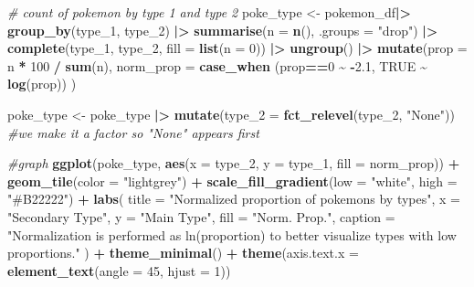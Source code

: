\documentclass[
]{article}
\newenvironment{Shaded}{\begin{snugshade}}{\end{snugshade}}
\newcommand{\AttributeTok}[1]{\textcolor[rgb]{0.13,0.29,0.53}{#1}}
\newcommand{\CommentTok}[1]{\textcolor[rgb]{0.56,0.35,0.01}{\textit{#1}}}
\newcommand{\ConstantTok}[1]{\textcolor[rgb]{0.56,0.35,0.01}{#1}}
\newcommand{\DecValTok}[1]{\textcolor[rgb]{0.00,0.00,0.81}{#1}}
\newcommand{\FloatTok}[1]{\textcolor[rgb]{0.00,0.00,0.81}{#1}}
\newcommand{\FunctionTok}[1]{\textcolor[rgb]{0.13,0.29,0.53}{\textbf{#1}}}
\newcommand{\NormalTok}[1]{#1}
\newcommand{\OtherTok}[1]{\textcolor[rgb]{0.56,0.35,0.01}{#1}}
\newcommand{\SpecialCharTok}[1]{\textcolor[rgb]{0.81,0.36,0.00}{\textbf{#1}}}
\newcommand{\StringTok}[1]{\textcolor[rgb]{0.31,0.60,0.02}{#1}}
\begin{document}
\begin{Shaded}
\begin{Highlighting}[]
\CommentTok{\# count of pokemon by type 1 and type 2}
\NormalTok{poke\_type }\OtherTok{\textless{}{-}}\NormalTok{ pokemon\_df}\SpecialCharTok{|\textgreater{}} 
  \FunctionTok{group\_by}\NormalTok{(type\_1, type\_2) }\SpecialCharTok{|\textgreater{}} 
  \FunctionTok{summarise}\NormalTok{(}\AttributeTok{n =} \FunctionTok{n}\NormalTok{(), }\AttributeTok{.groups =} \StringTok{"drop"}\NormalTok{) }\SpecialCharTok{|\textgreater{}}
  \FunctionTok{complete}\NormalTok{(type\_1, type\_2, }\AttributeTok{fill =} \FunctionTok{list}\NormalTok{(}\AttributeTok{n =} \DecValTok{0}\NormalTok{)) }\SpecialCharTok{|\textgreater{}}
  \FunctionTok{ungroup}\NormalTok{() }\SpecialCharTok{|\textgreater{}} 
  \FunctionTok{mutate}\NormalTok{(}\AttributeTok{prop =}\NormalTok{ n }\SpecialCharTok{*} \DecValTok{100} \SpecialCharTok{/} \FunctionTok{sum}\NormalTok{(n), }
         \AttributeTok{norm\_prop =} \FunctionTok{case\_when}\NormalTok{ (prop}\SpecialCharTok{==}\DecValTok{0} \SpecialCharTok{\textasciitilde{}} \SpecialCharTok{{-}}\FloatTok{2.1}\NormalTok{,}
                                \ConstantTok{TRUE} \SpecialCharTok{\textasciitilde{}} \FunctionTok{log}\NormalTok{(prop))}
\NormalTok{        )}

\NormalTok{poke\_type }\OtherTok{\textless{}{-}}\NormalTok{ poke\_type }\SpecialCharTok{|\textgreater{}}
  \FunctionTok{mutate}\NormalTok{(}\AttributeTok{type\_2 =} \FunctionTok{fct\_relevel}\NormalTok{(type\_2, }\StringTok{"None"}\NormalTok{)) }\CommentTok{\#we make it a factor so "None" appears first}

\CommentTok{\#graph }
\FunctionTok{ggplot}\NormalTok{(poke\_type, }\FunctionTok{aes}\NormalTok{(}\AttributeTok{x =}\NormalTok{ type\_2, }\AttributeTok{y =}\NormalTok{ type\_1, }\AttributeTok{fill =}\NormalTok{ norm\_prop)) }\SpecialCharTok{+}
  \FunctionTok{geom\_tile}\NormalTok{(}\AttributeTok{color =} \StringTok{"lightgrey"}\NormalTok{) }\SpecialCharTok{+}
  \FunctionTok{scale\_fill\_gradient}\NormalTok{(}\AttributeTok{low =} \StringTok{"white"}\NormalTok{, }\AttributeTok{high =} \StringTok{"\#B22222"}\NormalTok{) }\SpecialCharTok{+}
  \FunctionTok{labs}\NormalTok{(}
    \AttributeTok{title =} \StringTok{"Normalized proportion of pokemons by types"}\NormalTok{,}
    \AttributeTok{x =} \StringTok{"Secondary Type"}\NormalTok{,}
    \AttributeTok{y =} \StringTok{"Main Type"}\NormalTok{,}
    \AttributeTok{fill =} \StringTok{"Norm. Prop."}\NormalTok{,}
    \AttributeTok{caption =} \StringTok{"Normalization is performed as ln(proportion) to better visualize types with low proportions."}
\NormalTok{  ) }\SpecialCharTok{+}
  \FunctionTok{theme\_minimal}\NormalTok{() }\SpecialCharTok{+}
  \FunctionTok{theme}\NormalTok{(}\AttributeTok{axis.text.x =} \FunctionTok{element\_text}\NormalTok{(}\AttributeTok{angle =} \DecValTok{45}\NormalTok{, }\AttributeTok{hjust =} \DecValTok{1}\NormalTok{))}
\end{Highlighting}
\end{Shaded}
\end{document}
